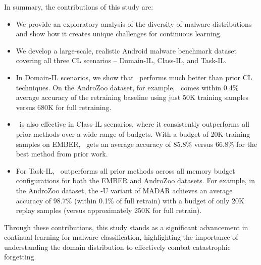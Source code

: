 In summary, the contributions of this study are:
\begin{itemize}
    \item We provide an exploratory analysis of the diversity of malware distributions and show how it creates unique challenges for continuous learning.

    \item We develop a large-scale, realistic Android malware benchmark dataset covering all three CL scenarios -- Domain-IL, Class-IL, and Task-IL.
    
    \item In Domain-IL scenarios, we show that \system\ performs much better than prior CL techniques. On the AndroZoo dataset, for example, \system\ comes within 0.4\% average accuracy of the  retraining baseline using just 50K training samples versus 680K for full retraining.
    

    \item \system\ is also effective in Class-IL scenarios, where it consistently outperforms all prior methods over a wide range of budgets. With a budget of 20K training samples on EMBER, \system\ gets an average accuracy of $85.8\%$ versus $66.8\%$ for the best method from prior work.
    
    \item For Task-IL, \system\ outperforms all prior methods across all memory budget configurations for both the EMBER and AndroZoo datasets. For example, in the AndroZoo dataset, the \system-U variant of MADAR achieves an average accuracy of 98.7\% (within 0.1\% of full retrain) with a budget of only 20K replay samples (versus approximately 250K for full retrain).
    
\end{itemize}

Through these contributions, this study stands as a significant advancement in continual learning for malware classification, highlighting the importance of understanding the domain distribution to effectively combat catastrophic forgetting. 




